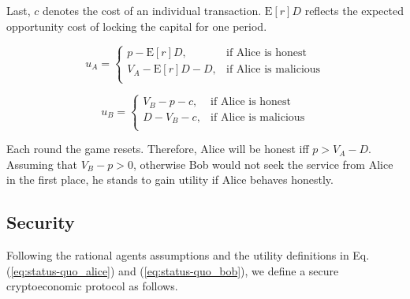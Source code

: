 \documentclass[runningheads]{llncs}
\begin{document}
Last, $c$ denotes the cost of an individual transaction. 
$\mathrm{E}[r]D$ reflects the expected opportunity cost of locking the capital for one period. %


\begin{equation}
\label{eq:status-quo_alice}
u_A = 
\begin{cases}
    p - \mathrm{E}[r]D, & \text{if Alice is honest} \\
    V_A - \mathrm{E}[r]D-D, & \text{if Alice is malicious} \\
\end{cases}
\end{equation}





\begin{equation}
\label{eq:status-quo_bob}
u_B= 
\begin{cases}
V_B - p-c, & \text{if Alice is honest} \\
D -V_B -c , & \text{if Alice is malicious} \\
\end{cases}
\end{equation}


Each round the game resets. 
Therefore, Alice will be honest iff $p > V_A -D$. %
Assuming that $V_B-p>0$, otherwise Bob would not seek the service from Alice in the first place, he stands to gain utility if Alice behaves honestly. %

\subsection{Security}
Following the rational agents assumptions and the utility definitions in Eq. (\ref{eq:status-quo_alice}) and (\ref{eq:status-quo_bob}), we define a secure cryptoeconomic protocol as follows.
\end{document}
